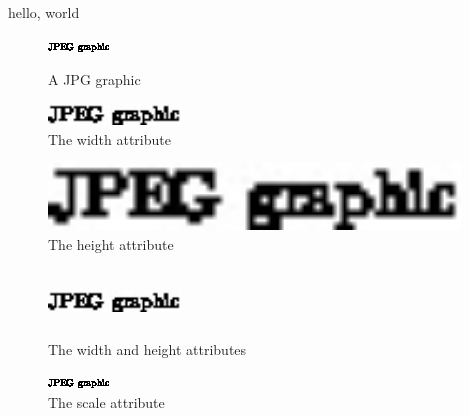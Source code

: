 \documentclass{amsart}
\begin{document}
hello, world

\begin{figure}[h]


\includegraphics[alt=ALT TEST FOR JPG GRAPHIC]{sample-jpeg}

\caption{A JPG graphic}
\end{figure}

\begin{figure}[h]
\includegraphics[width=100pt]{sample-jpeg}
\caption{The width attribute}
\end{figure}

\begin{figure}[h]
\includegraphics[height=50pt]{sample-jpeg}
\caption{The height attribute}
\end{figure}

\begin{figure}[h]
\includegraphics[width=100pt,height=50pt]{sample-jpeg}
\caption{The width and height attributes}
\end{figure}

\begin{figure}[h]
\includegraphics[scale=2]{sample-jpeg}
\caption{The scale attribute}
\end{figure}
\end{document}
